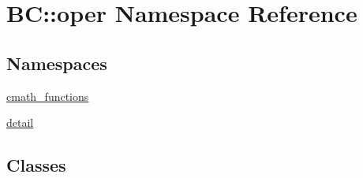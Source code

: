 \hypertarget{namespaceBC_1_1oper}{}\section{BC\+:\+:oper Namespace Reference}
\label{namespaceBC_1_1oper}
\subsection*{Namespaces}
\begin{DoxyCompactItemize}
\item 
 \hyperlink{namespaceBC_1_1oper_1_1cmath__functions}{cmath\+\_\+functions}
\item 
 \hyperlink{namespaceBC_1_1oper_1_1detail}{detail}
\end{DoxyCompactItemize}
\subsection*{Classes}
